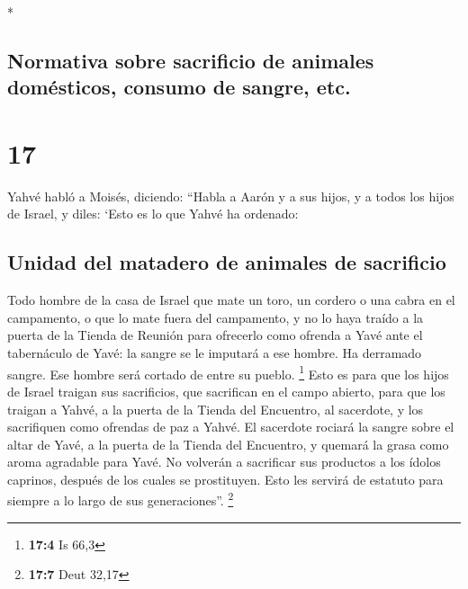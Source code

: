\begin{paracol}{2}
\begin{otherlanguage}{english}
\end{otherlanguage}

\switchcolumn[0]*

\hypertarget{normativa-sobre-sacrificio-de-animales-domuxe9sticos-consumo-de-sangre-etc.}{%
\subsection{Normativa sobre sacrificio de animales domésticos, consumo
de sangre,
etc.}\label{normativa-sobre-sacrificio-de-animales-domuxe9sticos-consumo-de-sangre-etc.}}

\hypertarget{section-32}{%
\section{17}\label{section-32}}

 Yahvé habló a Moisés, diciendo:  ``Habla a
Aarón y a sus hijos, y a todos los hijos de Israel, y diles: `Esto es lo
que Yahvé ha ordenado:

\hypertarget{unidad-del-matadero-de-animales-de-sacrificio}{%
\subsection{Unidad del matadero de animales de
sacrificio}\label{unidad-del-matadero-de-animales-de-sacrificio}}

 Todo hombre de la casa de Israel que mate un toro, un
cordero o una cabra en el campamento, o que lo mate fuera del
campamento,  y no lo haya traído a la puerta de la Tienda
de Reunión para ofrecerlo como ofrenda a Yavé ante el tabernáculo de
Yavé: la sangre se le imputará a ese hombre. Ha derramado sangre. Ese
hombre será cortado de entre su pueblo. \footnote{\textbf{17:4} Is 66,3}
 Esto es para que los hijos de Israel traigan sus
sacrificios, que sacrifican en el campo abierto, para que los traigan a
Yahvé, a la puerta de la Tienda del Encuentro, al sacerdote, y los
sacrifiquen como ofrendas de paz a Yahvé.  El sacerdote
rociará la sangre sobre el altar de Yavé, a la puerta de la Tienda del
Encuentro, y quemará la grasa como aroma agradable para Yavé.
 No volverán a sacrificar sus productos a los ídolos
caprinos, después de los cuales se prostituyen. Esto les servirá de
estatuto para siempre a lo largo de sus generaciones''. \footnote{\textbf{17:7}
  Deut 32,17}

\hypertarget{unidad-del-lugar-del-sacrificio-en-el-tabernaculo-del-testimonio}{%
}
\end{paracol}

